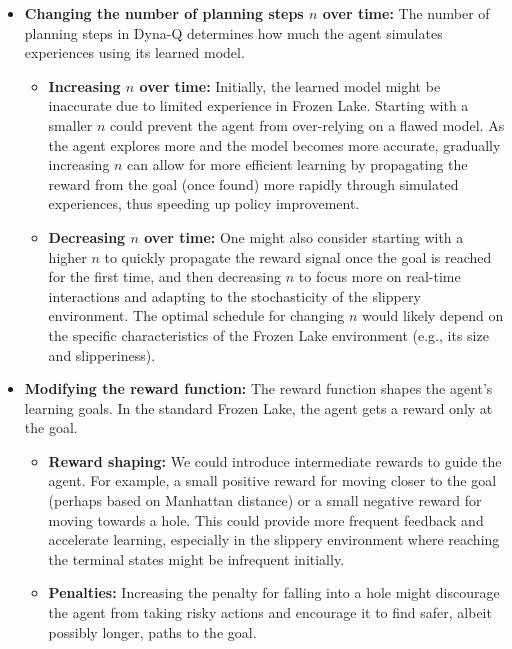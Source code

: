 \begin{itemize}
    \item \textbf{Changing the number of planning steps $n$ over time:}
    The number of planning steps in Dyna-Q determines how much the agent simulates experiences using its learned model.
    \begin{itemize}
        \item \textbf{Increasing $n$ over time:} Initially, the learned model might be inaccurate due to limited experience in Frozen Lake. Starting with a smaller $n$ could prevent the agent from over-relying on a flawed model. As the agent explores more and the model becomes more accurate, gradually increasing $n$ can allow for more efficient learning by propagating the reward from the goal (once found) more rapidly through simulated experiences, thus speeding up policy improvement.
        \item \textbf{Decreasing $n$ over time:} One might also consider starting with a higher $n$ to quickly propagate the reward signal once the goal is reached for the first time, and then decreasing $n$ to focus more on real-time interactions and adapting to the stochasticity of the slippery environment. The optimal schedule for changing $n$ would likely depend on the specific characteristics of the Frozen Lake environment (e.g., its size and slipperiness).
    \end{itemize}

    \item \textbf{Modifying the reward function:}
    The reward function shapes the agent's learning goals. In the standard Frozen Lake, the agent gets a reward only at the goal.
    \begin{itemize}
        \item \textbf{Reward shaping:} We could introduce intermediate rewards to guide the agent. For example, a small positive reward for moving closer to the goal (perhaps based on Manhattan distance) or a small negative reward for moving towards a hole. This could provide more frequent feedback and accelerate learning, especially in the slippery environment where reaching the terminal states might be infrequent initially.
        \item \textbf{Penalties:} Increasing the penalty for falling into a hole might discourage the agent from taking risky actions and encourage it to find safer, albeit possibly longer, paths to the goal.
    \end{itemize}


\end{itemize}
